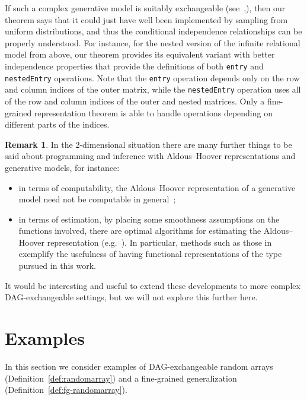 \documentclass[10pt]{amsart}
\theoremstyle{definition}\newtheorem{defi}[theo]{Definition}\newtheorem{rema}[theo]{Remark}\newtheorem{exam}[theo]{Example}\newtheorem{exem}[theo]{Example}\newtheorem{nota}[theo]{Notation}
\begin{document}
If such a complex generative model is suitably exchangeable (see~\cite{statonetal2017pps},\linebreak\cite{statonetal2018icalp}), then our theorem says that it could just have well been implemented by sampling from uniform distributions, and thus the conditional independence relationships can be properly understood. For instance, for the nested version of the infinite relational model from above, our theorem provides its equivalent variant with better independence properties that provide the definitions of both \texttt{entry} and \texttt{nestedEntry} operations. Note that the \texttt{entry} operation depends only on the row and column indices of the outer matrix, while the \texttt{nestedEntry} operation uses all of the row and column indices of the outer and nested matrices. Only a fine-grained representation theorem is able to handle operations depending on different parts of the indices.

\begin{rema}
In the 2-dimensional situation there are many further things to be said about programming and inference with Aldous--Hoover representations and generative models, for instance:
\begin{itemize}
\item in terms of computability, the Aldous--Hoover representation of a generative model need not be computable in general~\cite{ackermanetal2018graphons,freer-roy2012apal};
\item in terms of estimation, by placing some smoothness assumptions on the functions involved, there are optimal algorithms for estimating the Aldous--Hoover representation (e.g.~\cite{glz-graphon}). In particular, methods such as those in~\cite{glz-graphon} exemplify the usefulness of having functional representations of the type pursued in this work.
\end{itemize}
It would be interesting and useful to extend these developments to more complex DAG-exchangeable settings, but we will not explore this further here.
\end{rema}


\section{Examples}\label{sec:setup}

In this section we consider examples of DAG-exchangeable random arrays (Definition~\ref{def:randomarray}) and a fine-grained generalization (Definition~\ref{def:fg-randomarray}).
\end{document}
